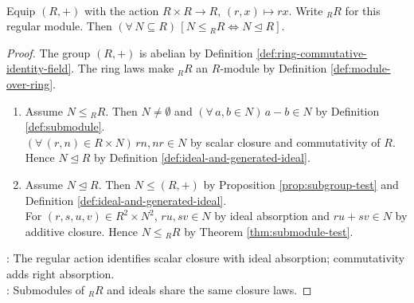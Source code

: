 \begin{proposition} \label{prop:submodules-of-regular-module-are-ideals} \\
Equip $(R,+)$ with the action $R\times R\to R$, $(r,x)\mapsto rx$. Write ${}_R R$ for this regular module. Then $(\forall\,N\subseteq R)\,[N\leq{}_R R\Longleftrightarrow N\trianglelefteq R]$.
\begin{proof}
The group $(R,+)$ is abelian by Definition \ref{def:ring-commutative-identity-field}. The ring laws make ${}_R R$ an $R$-module by Definition \ref{def:module-over-ring}.
\begin{enumerate}[label=\roman*.]
\setlength{\itemsep}{0pt}
\item[$(\Rightarrow)$] Assume $N\leq{}_R R$. Then $N\neq\emptyset$ and $(\forall\,a,b\in N)\,a-b\in N$ by Definition \ref{def:submodule}.\\
$(\forall\,(r,n)\in R\times N)\,rn,nr\in N$ by scalar closure and commutativity of $R$. Hence $N\trianglelefteq R$ by Definition \ref{def:ideal-and-generated-ideal}.
\item[$(\Leftarrow)$] Assume $N\trianglelefteq R$. Then $N\leq(R,+)$ by Proposition \ref{prop:subgroup-test} and Definition \ref{def:ideal-and-generated-ideal}.\\
For $(r,s,u,v)\in R^2\times N^2$, $ru,sv\in N$ by ideal absorption and $ru+sv\in N$ by additive closure. Hence $N\leq{}_R R$ by Theorem \ref{thm:submodule-test}.
\end{enumerate}
: The regular action identifies scalar closure with ideal absorption; commutativity adds right absorption.\\
: Submodules of ${}_R R$ and ideals share the same closure laws.
\end{proof}
\end{proposition}
